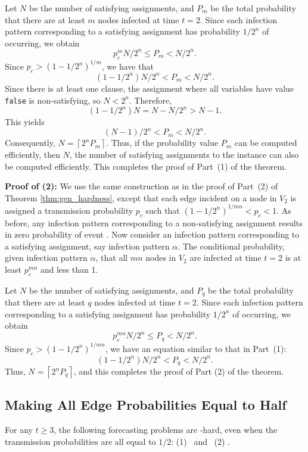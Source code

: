 Let $N$ be the number of satisfying assignments, and $P_m$ be the
total probability that there are at least $m$ nodes infected at
time $t = 2$.  
Since each infection pattern corresponding to a
satisfying assignment has probability $1/2^n$ of occurring, we
obtain $$p_c^m N/2^n \leq P_m < N/2^n.$$
Since  $p_c > ( 1 - 1/2^n)^{1/m}$, we have that 
$$( 1 - 1/2^n) N/2^n < P_m < N/2^n.$$
Since there is at least one clause, the assignment where all variables
have value {\tt false} is non-satisfying, so $N < 2^n$. Therefore,
$$( 1 - 1/2^n) N = N - N/2^n > N-1.$$
This yields 
$$(N-1)/2^n < P_m < N/2^n.$$
Consequently, 
$\displaystyle{N = \left\lceil 2^n P_m \right\rceil}$.
Thus, if the probability value $P_m$ can be computed efficiently,
then $N$, the number of satisfying assignments to the 
\mtsat{} instance can also be computed efficiently.
This completes the proof of Part~(1) of the theorem.

\medskip
\noindent
\textbf{Proof of (2):}
We use the same construction as in the proof of
Part~(2) of  Theorem \ref{thm:gen_hardness},
except that each edge incident on a node in $V_2$ is assigned a
transmission probability $p_c$ such that 
$( 1 - 1/2^n)^{1/{mn}} < p_c <1$.  
As before, any infection pattern corresponding to a
non-satisfying assignment results in zero probability of event \cale{}.  
Now consider an infection pattern corresponding to a
satisfying assignment, say infection pattern $\alpha$.  
The conditional probability, given infection pattern $\alpha$, 
that all $mn$ nodes in $V_2$ are infected at time 
$t = 2$ is at least $p_c^{mn}$ and less than 1.

Let $N$ be the number of satisfying assignments, and $P_q$ be the
total probability that there are at least $q$ nodes infected at
time $t = 2$.  
Since each infection pattern corresponding to a
satisfying assignment has probability $1/2^n$ of occurring, we obtain
$$p_c^{mn} N/2^n \leq P_q < N/2^n.$$
Since  $p_c > ( 1 - 1/2^n)^{1/{mn}}$, we have  
an equation similar to that in Part~(1):
$$( 1 - 1/2^n) N/2^n < P_q < N/2^n.$$
Thus, 
$N = \displaystyle{\left\lceil 2^n P_q \right\rceil}$,
and this completes the proof of Part (2) of the theorem.
\QED


\subsection{Making All Edge Probabilities Equal to Half}

\begin{theorem}\label{thm:gen_hardness_prob_half}
For any $t \geq 3$, the following forecasting problems are \cnump-hard,
even when the transmission probabilities are all equal to $1/2$:
(1)  \tNewInfv{} ~and~ 
(2)  \tTotInfv{}.
\end{theorem}

